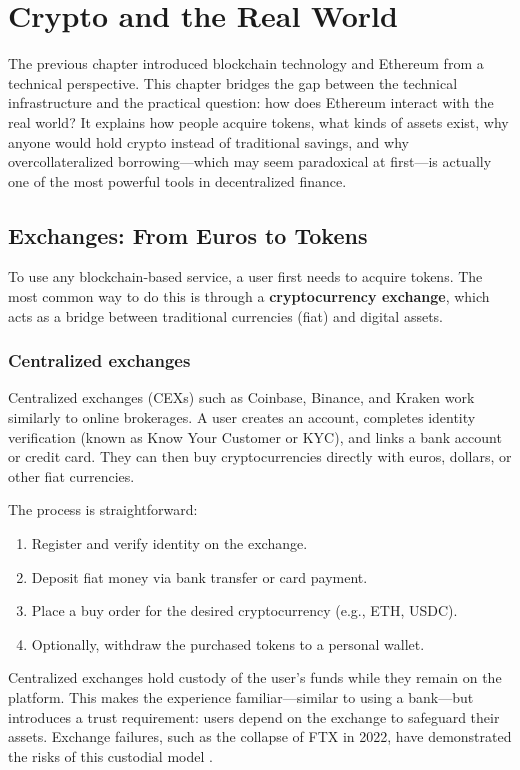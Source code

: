 \chapter{Crypto and the Real World}
\label{chap:crypto-real-world}

The previous chapter introduced blockchain technology and Ethereum from a technical perspective. This chapter bridges the gap between the technical infrastructure and the practical question: how does Ethereum interact with the real world? It explains how people acquire tokens, what kinds of assets exist, why anyone would hold crypto instead of traditional savings, and why overcollateralized borrowing---which may seem paradoxical at first---is actually one of the most powerful tools in decentralized finance.

\section{Exchanges: From Euros to Tokens}

To use any blockchain-based service, a user first needs to acquire tokens. The most common way to do this is through a \textbf{cryptocurrency exchange}, which acts as a bridge between traditional currencies (fiat) and digital assets.

\subsection{Centralized exchanges}

Centralized exchanges (CEXs) such as Coinbase, Binance, and Kraken work similarly to online brokerages. A user creates an account, completes identity verification (known as Know Your Customer or KYC), and links a bank account or credit card. They can then buy cryptocurrencies directly with euros, dollars, or other fiat currencies.

The process is straightforward:
\begin{enumerate}
    \item Register and verify identity on the exchange.
    \item Deposit fiat money via bank transfer or card payment.
    \item Place a buy order for the desired cryptocurrency (e.g., ETH, USDC).
    \item Optionally, withdraw the purchased tokens to a personal wallet.
\end{enumerate}

Centralized exchanges hold custody of the user's funds while they remain on the platform. This makes the experience familiar---similar to using a bank---but introduces a trust requirement: users depend on the exchange to safeguard their assets. Exchange failures, such as the collapse of FTX in 2022, have demonstrated the risks of this custodial model \cite{ftxCollapse}.

